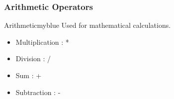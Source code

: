\vspace{0.25cm}
\subsubsection{Arithmetic Operators}
\begin{prettyBox}{Arithmetic}{myblue}
Used for mathematical calculations.
    \begin{itemize} 
           \item Multiplication : *
           \item Division : / 
           \item Sum : + 
           \item Subtraction : -
           \end{itemize}
\end{prettyBox}

